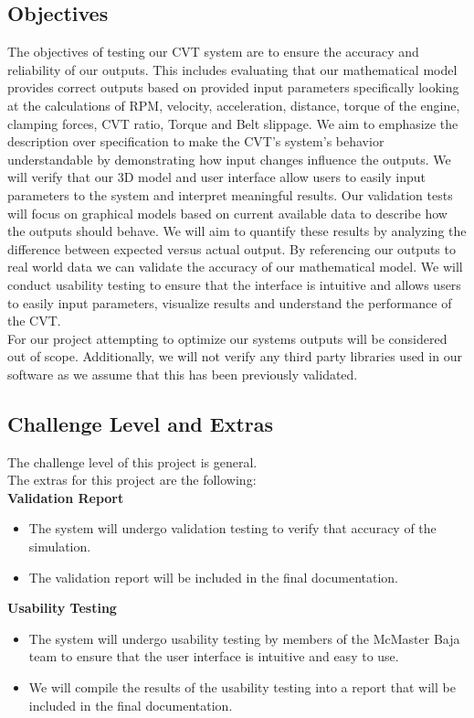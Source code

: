 \documentclass[12pt, titlepage]{article}
\begin{document}
\subsection{Objectives}

\noindent The objectives of testing our CVT system are to ensure the accuracy and reliability of our outputs. 
This includes evaluating that our mathematical model provides correct outputs based on provided input parameters specifically looking at the calculations of RPM, velocity, acceleration, distance, torque of the engine, clamping forces, CVT ratio, Torque and Belt slippage. 
We aim to emphasize the description over specification to make the CVT's system's behavior understandable by demonstrating how input changes influence the outputs.
We will verify that our 3D model and user interface allow users to easily input parameters to the system and interpret meaningful results. 
Our validation tests will focus on graphical models based on current available data to describe how the outputs should behave. 
We will aim to quantify these results by analyzing the difference between expected versus actual output. 
By referencing our outputs to real world data we can validate the accuracy of our mathematical model.
We will conduct usability testing to ensure that the interface is intuitive and allows users to easily input parameters, visualize results and understand the performance of the CVT.
\\
\noindent For our project attempting to optimize our systems outputs will be considered out of scope. 
Additionally, we will not verify any third party libraries used in our software as we assume that this has been previously validated. 

\subsection{Challenge Level and Extras}

The challenge level of this project is general.\\
\newline
The extras for this project are the following:\\
\textbf{Validation Report}
{\begin{itemize}
  \item The system will undergo validation testing to verify that accuracy of the simulation.
  \item The validation report will be included in the final documentation.
\end{itemize}}
{\noindent}
\textbf{Usability Testing}
{\begin{itemize}
  \item The system will undergo usability testing by members of the McMaster Baja team to ensure that
  the user interface is intuitive and easy to use.
  \item We will compile the results of the usability testing into a report that will be included in the final documentation.
\end{itemize}}
\end{document}

